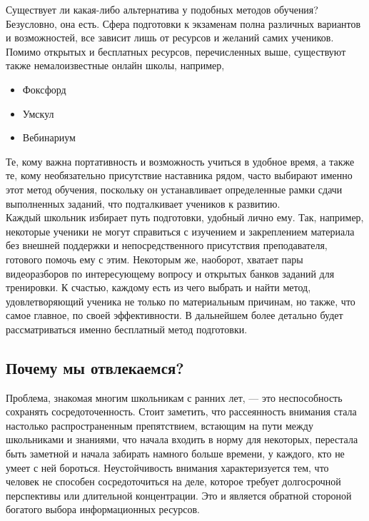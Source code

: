 \documentclass[a4paper, 12pt]{extarticle}
\begin{document}
Существует ли какая-либо альтернатива у подобных методов обучения?
Безусловно, она есть. Сфера подготовки к экзаменам полна различных вариантов
и возможностей, все зависит лишь от ресурсов и желаний самих учеников.
Помимо открытых и бесплатных ресурсов, перечисленных выше, существуют также
немалоизвестные онлайн школы, например,
\begin{itemize}
    \item {\small Фоксфорд\par}
    \item {\small Умскул\par}
    \item {\small Вебинариум\par}
\end{itemize}
Те, кому важна портативность и возможность учиться в удобное время, а
также те, кому необязательно присутствие наставника рядом, часто выбирают именно этот
метод обучения, поскольку он устанавливает определенные рамки сдачи выполненных
заданий, что подталкивает учеников к развитию.
\\

Каждый школьник избирает путь подготовки, удобный лично ему. Так, например,
некоторые ученики не могут справиться с изучением и закреплением материала без
внешней поддержки и непосредственного присутствия преподавателя, готового помочь
ему с этим. Некоторым же, наоборот, хватает пары видеоразборов по
интересующему вопросу и открытых банков заданий для тренировки. К счастью,
каждому есть из чего выбрать и найти метод, удовлетворяющий ученика не только
по материальным причинам, но также, что самое главное, по своей эффективности.
В дальнейшем более детально будет рассматриваться именно бесплатный метод
подготовки.
\newpage

\subsection{Почему мы отвлекаемся?}
Проблема, знакомая многим школьникам с ранних лет, — это неспособность
сохранять сосредоточенность. Стоит заметить, что рассеянность внимания
стала настолько распространенным препятствием, встающим на пути между
школьниками и знаниями, что начала входить в норму для некоторых, перестала
быть заметной и начала забирать намного больше времени, у каждого, кто не умеет
с ней бороться. Неустойчивость внимания характеризуется тем, что человек не способен
сосредоточиться на деле, которое требует долгосрочной перспективы или
длительной концентрации. Это и является обратной стороной богатого выбора
информационных ресурсов.
\\
\end{document}
